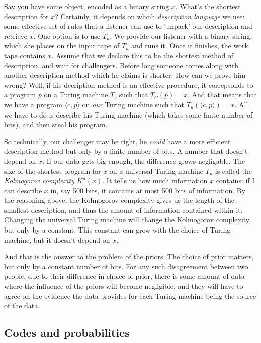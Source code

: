 Say you have some object, encoded as a binary string $x$. What's the shortest description for $x$? Certainly, it depends on whcih \emph{description language} we use: some effective set of rules that a listener can use to `unpack' our description and retrieve $x$. One option is to use $T_u$. We provide our listener with a binary string, which she places on the input tape of $T_u$ and runs it. Once it finishes, the work tape contains $x$. Assume that we declare this to be the shortest method of description, and wait for challengers. Before long someone comes along with another description method which he claims is shorter. How can we prove him wrong? Well, if his decription method is an effective procedure, it correpsonds to a program $p$ on a Turing machine $T_c$ such that $T_C(p) = x$. And that means that we have a program $\langle c, p\rangle$ on \emph{our} Turing machine such that $T_u(\langle c, p\rangle) = x$. All we have to do is describe his Turing machine (which takes some finite number of bits), and then steal his program.

So technically, our challenger may be right, he \emph{could} have a more efficient description method but only by a finite number of bits. A number that doesn't depend on $x$. If our data gets big enough, the difference grows negligable. The size of the shortest program for $x$ on a universal Turing machine $T_u$ is called the \emph{Kolmogorov complexity} $K^u(x)$. It tells us how much information $x$ contains: if I can describe $x$ in, say 500 bits, it contains at most 500 bits of information. By the reasoning above, the Kolmogorov complexity gives us the length of the smallest description, and thus the amount of information contained within it. Changing the universal Turing machine will change the Kolmogorov complexity, but only by a constant. This constant can grow with the choice of Turing machine, but it doesn't depend on $x$. 

And that is the answer to the problem of the priors. The choice of prior matters, but only by a constant number of bits. For any such disagreement between two people, due to their difference in choice of prior, there is some amount of data where the influence of the priors will become negligible, and they will have to agree on the evidence the data provides for each Turing machine being the source of the data. 

\subsection*{Codes and probabilities}

